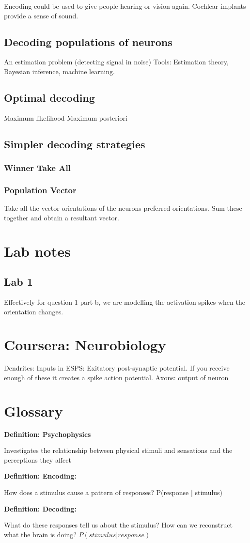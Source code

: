 \documentclass[11pt]{article}
\newcommand{\define}[2] {
  \textbf{Definition: #1}
  \begin{center} #2
\end{center}
}
\begin{document}
Encoding could be used to give people hearing or vision again. Cochlear implants provide a sense of sound. 

\subsection{Decoding populations of neurons}
An estimation problem (detecting signal in noise)
Tools: Estimation theory, Bayesian inference, machine learning. 

\subsection{Optimal decoding}
Maximum likelihood
Maximum posteriori

\subsection{Simpler decoding strategies}

\subsubsection{Winner Take All}

\subsubsection{Population Vector}
Take all the vector orientations of the neurons preferred orientations. Sum these together and obtain a resultant vector. 

\section{Lab notes}

\subsection{Lab 1}
Effectively for question 1 part b, we are modelling the activation spikes when the orientation changes.

\section{Coursera: Neurobiology}
Dendrites: Inputs in ESPS: Exitatory post-synaptic potential. If you receive enough of these it creates a spike action potential.
Axons: output of neuron

\section{Glossary}
\define{Psychophysics}{Investigates the relationship between physical stimuli and sensations and the perceptions they affect}
\define{Encoding:}{How does a stimulus cause a pattern of responses? P(response | stimulus)}
\define{Decoding:}{What do these responses tell us about the stimulus? How can we reconstruct what the brain is doing? $P(stimulus | response)$}
\end{document}
